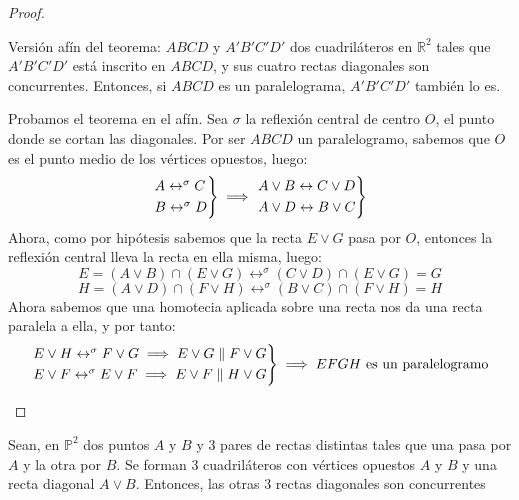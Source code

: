 \begin{proof} \hfill
	\begin{nlist}
	\item Versión afín del teorema: $ABCD$ y $A'B'C'D'$ dos cuadriláteros en $\mathbb{R}^2$ tales que $A'B'C'D'$ está inscrito en $ABCD$, y sus cuatro rectas diagonales son concurrentes. Entonces, si $ABCD$ es un paralelograma, $A'B'C'D'$ también lo es.
	\item Probamos el teorema en el afín. Sea $\sigma$ la reflexión central de centro $O$, el punto donde se cortan las diagonales. Por ser $ABCD$ un paralelogramo, sabemos que $O$ es el punto medio de los vértices opuestos, luego:
	\[
	\begin{rcases}
		A \leftrightarrow^\sigma C\\
		B \leftrightarrow^\sigma D
\end{rcases} \implies
	\begin{rcases}
		A\vee B \leftrightarrow C \vee D\\
		A \vee D \leftrightarrow B \vee C
\end{rcases}
\]
Ahora, como por hipótesis sabemos que la recta $E \vee G$ pasa por $O$, entonces la reflexión central lleva la recta en ella misma, luego:
$$E = (A \vee B) \cap (E \vee G) \leftrightarrow^\sigma (C \vee D) \cap (E \vee G) = G$$
$$H = (A \vee D) \cap (F \vee H) \leftrightarrow^\sigma (B \vee C) \cap (F \vee H) = H$$
Ahora sabemos que una homotecia aplicada sobre una recta nos da una recta paralela a ella, y por tanto:
\[
\begin{rcases}
	E\vee H \leftrightarrow^\sigma F \vee G \implies E \vee G \parallel F \vee G\\
	E\vee F \leftrightarrow^\sigma E \vee F \implies E \vee F \parallel H \vee G
\end{rcases} \implies EFGH \text{ es un paralelogramo}
\]
\end{nlist}
\end{proof}

\begin{nth}
Sean, en $\mathbb P^2$ dos puntos $A$ y $B$ y 3 pares de rectas distintas tales que una pasa por $A$ y la otra por $B$. Se forman 3 cuadriláteros con vértices opuestos $A$ y $B$ y una recta diagonal $A\vee B$. Entonces, las otras 3 rectas diagonales son concurrentes
\end{nth}

